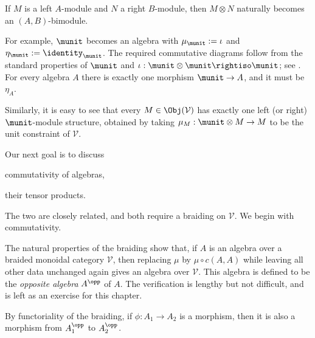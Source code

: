 If $M$ is a left $A$-module and $N$ a right $B$-module, then $M\otimes N$
naturally becomes an $(A,B)$-bimodule.

\begin{remark}\label{rem:unit-algebra}
	For example, $\munit$ becomes an algebra with
	$\mu_{\munit}:=\iota$ and
	$\eta_{\munit}:=\identity_{\munit}$. The required commutative diagrams
	follow from the standard properties of $\munit$ and
	$\iota:\munit\otimes\munit\rightiso\munit$; see
	\cite[Lemma 3.1.5]{Li1}. For every algebra $A$ there is exactly one
	morphism $\munit\to A$, and it must be $\eta_A$.
	
	Similarly, it is easy to see that every $M\in\Obj(\mathcal{V})$ has
	exactly one left (or right) $\munit$-module structure, obtained by taking
	$\mu_M:\munit\otimes M\to M$ to be the unit constraint of $\mathcal{V}$.
\end{remark}

Our next goal is to discuss
\begin{inparaenum}[(a)]
	\item commutativity of algebras,
	\item their tensor products.
\end{inparaenum}
The two are closely related, and both require a braiding on $\mathcal{V}$. We
begin with commutativity.

\begin{definition}\label{def:opposite-braided-algebra}
	The natural properties of the braiding show that, if $A$ is an algebra
	over a braided monoidal category $\mathcal{V}$, then replacing $\mu$ by
	$\mu\circ c(A,A)$ while leaving all other data unchanged again gives an
	algebra over $\mathcal{V}$. This algebra is defined to be the
	\emph{opposite algebra} $A^{\opp}$ of $A$. The verification is lengthy
	but not difficult, and is left as an exercise for this chapter.
\end{definition}

By functoriality of the braiding, if $\phi:A_1\to A_2$ is a morphism, then it
is also a morphism from $A_1^{\opp}$ to $A_2^{\opp}$.

